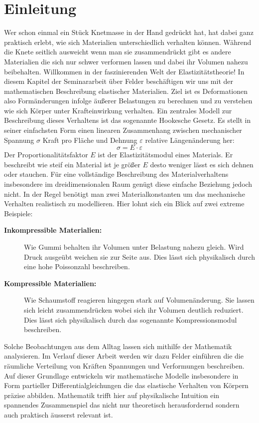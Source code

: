 %
%
%
%
\section{Einleitung}
\label{elastomechanik:section:Einleitung}
Wer schon einmal ein Stück Knetmasse in der Hand gedrückt hat, hat dabei ganz praktisch erlebt, wie sich Materialien unterschiedlich verhalten können. 
Während die Knete seitlich ausweicht wenn man sie zusammendrückt gibt es andere Materialien die sich nur schwer verformen lassen und dabei ihr Volumen nahezu beibehalten. 
Willkommen in der faszinierenden Welt der Elastizitätstheorie!
In diesem Kapitel der Seminararbeit über Felder beschäftigen wir uns mit der mathematischen Beschreibung elastischer Materialien.
Ziel ist es Deformationen also Formänderungen infolge äußerer Belastungen zu berechnen und zu verstehen wie sich Körper unter Krafteinwirkung verhalten.
Ein zentrales Modell zur Beschreibung dieses Verhaltens ist das sogenannte Hookesche Gesetz.
Es stellt in seiner einfachsten Form einen linearen Zusammenhang zwischen mechanischer Spannung $\sigma$ Kraft pro Fläche und Dehnung $\varepsilon$ relative Längenänderung her:
\begin{equation}
\sigma = E \cdot \varepsilon
\end{equation}
Der Proportionalitätsfaktor $E$ ist der Elastizitätsmodul eines Materials.
Er beschreibt wie steif ein Material ist je größer $E$ desto weniger lässt es sich dehnen oder stauchen.
Für eine vollständige Beschreibung des Materialverhaltens insbesondere im dreidimensionalen Raum genügt diese einfache Beziehung jedoch nicht.
In der Regel benötigt man zwei Materialkonstanten um das mechanische Verhalten realistisch zu modellieren.
Hier lohnt sich ein Blick auf zwei extreme Beispiele:
\begin{description}
\item[\textbf{Inkompressible Materialien:}] Wie Gummi behalten ihr Volumen unter Belastung nahezu gleich.
Wird Druck ausgeübt weichen sie zur Seite aus.
Dies lässt sich physikalisch durch eine hohe Poissonzahl beschreiben.
\item[\textbf{Kompressible Materialien:}]  Wie Schaumstoff reagieren hingegen stark auf Volumenänderung.
Sie lassen sich leicht zusammendrücken wobei sich ihr Volumen deutlich reduziert.
Dies lässt sich physikalisch durch das sogenannte Kompressionsmodul beschreiben.
\end{description}

Solche Beobachtungen aus dem Alltag lassen sich mithilfe der Mathematik analysieren.
Im Verlauf dieser Arbeit werden wir dazu Felder einführen die die räumliche Verteilung von Kräften Spannungen und Verformungen beschreiben.
Auf dieser Grundlage entwickeln wir mathematische Modelle insbesondere in Form partieller Differentialgleichungen die das elastische Verhalten von Körpern präzise abbilden.
Mathematik trifft hier auf physikalische Intuition ein spannendes Zusammenspiel das nicht nur theoretisch herausfordernd sondern auch praktisch äusserst relevant ist.


